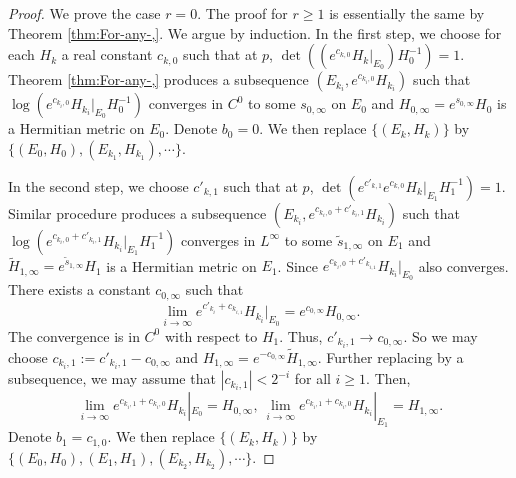\documentclass[10pt,a4paper]{amsart}
\begin{document}
\begin{proof}
We prove the case $r=0$. The proof for $r\geq1$ is essentially the same
by Theorem \ref{thm:For-any-,}. We argue by induction. In the first
step, we choose for each $H_{k}$ a real constant $c_{k,0}$ such
that at $p$, $\det((e^{c_{k,0}}H_{k}|_{E_{0}})H_{0}^{-1})=1$. Theorem
\ref{thm:For-any-,} produces a subsequence $(E_{k_{i}},e^{c_{k_{i},0}}H_{k_{i}})$
such that $\log(e^{c_{k_{i},0}}H_{k_{i}}|_{E_{0}}H_{0}^{-1})$ converges
in $C^{0}$ to some $s_{0,\infty}$ on $E_{0}$ and $H_{0,\infty}=e^{s_{0,\infty}}H_{0}$
is a Hermitian metric on $E_{0}$. Denote $b_{0}=0$. We then replace
$\{(E_{k},H_{k})\}$ by $\{(E_{0},H_{0}),(E_{k_{1}},H_{k_{1}}),\cdots\}$.

In the second step, we choose $c'_{k,1}$ such that at $p$, $\det(e^{c'_{k,1}}e^{c_{k,0}}H_{k}|_{E_{1}}H_{1}^{-1})=1$.
Similar procedure produces a subsequence $(E_{k_{i}},e^{c_{k_{i},0}+c'_{k_{i},1}}H_{k_{i}})$
such that $\log(e^{c_{k_{i},0}+c'_{k_{i},1}}H_{k_{i}}|_{E_{1}}H_{1}^{-1})$
converges in $L^{\infty}$ to some $\tilde{s}_{1,\infty}$ on $E_{1}$
and $\tilde{H}_{1,\infty}=e^{\tilde{s}_{1,\infty}}H_{1}$ is a Hermitian
metric on $E_{1}$. Since $e^{c_{k_{i},0}+c'_{k_{i,1}}}H_{k_{i}}|_{E_{0}}$
also converges. There exists a constant $c_{0,\infty}$ such that
\[
\lim_{i\to\infty}e^{c'_{k_{i}}+c_{k_{i,1}}}H_{k_{i}}|_{E_{0}}=e^{c_{0,\infty}}H_{0,\infty}.
\]
The convergence is in $C^0$ with respect to $H_1$. Thus, $c'_{k_{i},1}\to c_{0,\infty}$. So we may choose $c_{k_{i},1}:=c'_{k_{i},1}-c_{0,\infty}$
and $H_{1,\infty}=e^{-c_{0,\infty}}\tilde{H}_{1,\infty}$. Further
replacing by a subsequence, we may assume that $|c_{k_{i},1}|<2^{-i}$
for all $i\geq1$. Then, 
\[
\lim_{i\to\infty}e^{c_{k_{i},1}+c_{k_{i},0}}H_{k_{i}}|_{E_{0}}=H_{0,\infty},\ \lim_{i\to\infty}e^{c_{k_{i},1}+c_{k_{i},0}}H_{k_{i}}|_{E_{1}}=H_{1,\infty}.
\]
Denote $b_{1}=c_{1,0}$. We then replace $\{(E_{k},H_{k})\}$ by $\{(E_{0},H_{0}),(E_{1},H_{1}),(E_{k_{2}},H_{k_{2}}),\cdots\}$.


\end{proof}
\end{document}
